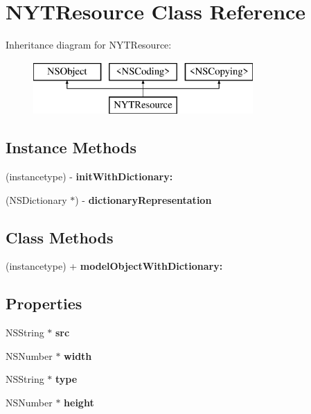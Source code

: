 \section{N\+Y\+T\+Resource Class Reference}
\label{interface_n_y_t_resource}
Inheritance diagram for N\+Y\+T\+Resource\+:\begin{figure}[H]
\begin{center}
\leavevmode
\includegraphics[height=2.000000cm]{interface_n_y_t_resource}
\end{center}
\end{figure}
\subsection*{Instance Methods}
\begin{DoxyCompactItemize}
\item 
(instancetype) -\/ {\bfseries init\+With\+Dictionary\+:}\label{interface_n_y_t_resource_a642463ec842af79d130248369f4db64e}

\item 
(N\+S\+Dictionary $\ast$) -\/ {\bfseries dictionary\+Representation}\label{interface_n_y_t_resource_a87f1900c0104dc1904330691d8d9f88b}

\end{DoxyCompactItemize}
\subsection*{Class Methods}
\begin{DoxyCompactItemize}
\item 
(instancetype) + {\bfseries model\+Object\+With\+Dictionary\+:}\label{interface_n_y_t_resource_a521e276ef561c82a76ab2011a297d520}

\end{DoxyCompactItemize}
\subsection*{Properties}
\begin{DoxyCompactItemize}
\item 
N\+S\+String $\ast$ {\bfseries src}\label{interface_n_y_t_resource_ad5d4ebd4b2161ae49d71e191ba845673}

\item 
N\+S\+Number $\ast$ {\bfseries width}\label{interface_n_y_t_resource_ad064bd6f66af01b50dd8b21fab5639cc}

\item 
N\+S\+String $\ast$ {\bfseries type}\label{interface_n_y_t_resource_ab263d7f5938acfe1e24714d0c5b1ea54}

\item 
N\+S\+Number $\ast$ {\bfseries height}\label{interface_n_y_t_resource_aaa4f0c2d0af6213d6dddbf46f5174cea}

\end{DoxyCompactItemize}


